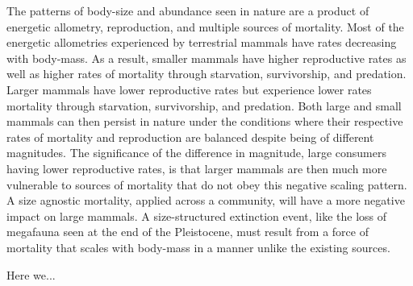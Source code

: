 \documentclass[11pt]{article}
\begin{document}

The patterns of body-size and abundance seen in nature are a product of energetic allometry, reproduction, and multiple sources of mortality. Most of the energetic allometries experienced by terrestrial mammals have rates decreasing with body-mass. As a result, smaller mammals have higher reproductive rates as well as higher rates of mortality through starvation, survivorship, and predation. Larger mammals have lower reproductive rates but experience lower rates mortality through starvation, survivorship, and predation. Both large and small mammals can then persist in nature under the conditions where their respective rates of mortality and reproduction are balanced despite being of different magnitudes. The significance of the difference in magnitude, large consumers having lower reproductive rates, is that larger mammals are then much more vulnerable to sources of mortality that do not obey this negative scaling pattern. A size agnostic mortality, applied across a community, will have a more negative impact on large mammals.  A size-structured extinction event, like the loss of megafauna seen at the end of the Pleistocene, must result from a force of mortality that scales with body-mass in a manner unlike the existing sources. 


Here we...




\end{document}
